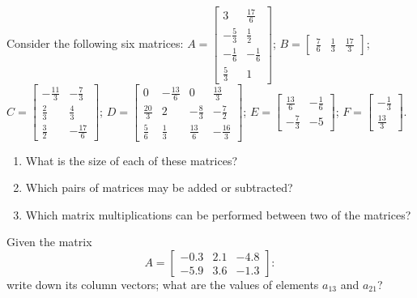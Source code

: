 \begin{exercise} \label{ex:} 
Consider the following six matrices:
\(A=\begin{bmatrix} 3&\tfrac{17}{6}
\\-\tfrac{5}{3}&\tfrac{1}{2}
\\-\tfrac{1}{6}&-\tfrac{1}{6}
\\\tfrac{5}{3}&1 \end{bmatrix}\);
\(B=\begin{bmatrix} \tfrac{7}{6}&\tfrac{1}{3}&\tfrac{17}{3} \end{bmatrix}\);
\(C=\begin{bmatrix} -\tfrac{11}{3}&-\tfrac{7}{3}
\\\tfrac{2}{3}&\tfrac{4}{3}
\\\tfrac{3}{2}&-\tfrac{17}{6} \end{bmatrix}\);
\(D=\begin{bmatrix} 0&-\tfrac{13}{6}&0&\tfrac{13}{3}
\\\tfrac{20}{3}&2&-\tfrac{8}{3}&-\tfrac{7}{2}
\\\tfrac{5}{6}&\tfrac{1}{3}&\tfrac{13}{6}&-\tfrac{16}{3} \end{bmatrix}\);
\(E=\begin{bmatrix} \tfrac{13}{6}&-\tfrac{1}{6}
\\-\tfrac{7}{3}&-5 \end{bmatrix}\);
\(F=\begin{bmatrix} -\tfrac{1}{3}
\\\tfrac{13}{3} \end{bmatrix}\).
\begin{enumerate}
\item What is the size of each of these matrices?

\item  Which pairs of matrices may be added or subtracted?

\item  Which matrix multiplications can be performed between two of the matrices?

\end{enumerate}
\end{exercise}


\begin{exercise} \label{ex:} 
Given the matrix
\begin{equation*}
A=\begin{bmatrix} -0.3&2.1&-4.8
\\  -5.9&3.6&-1.3 \end{bmatrix}:
\end{equation*}
 write down its column vectors; what are the values of elements \(a_{13}\) and \(a_{21}\)?
\end{exercise}


